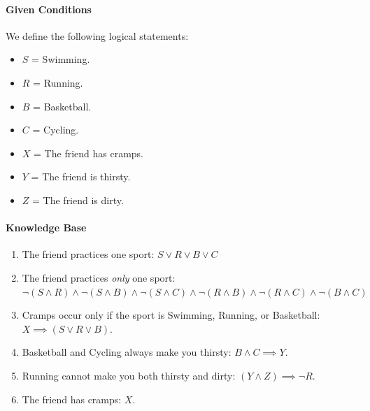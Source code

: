 \documentclass[11pt]{article}
\numberwithin{equation}{section}
\begin{document}
\begin{enumerate}
{\paragraph{Given Conditions}
We define the following logical statements:
\begin{itemize}
    \item $S$ = Swimming.
    \item $R$ = Running.
    \item $B$ = Basketball.
    \item $C$ = Cycling.
    \item $X$ = The friend has cramps.
    \item $Y$ = The friend is thirsty.
    \item $Z$ = The friend is dirty.
\end{itemize}

\paragraph{Knowledge Base}
\begin{enumerate}
    \item The friend practices one sport: $S \lor R \lor B \lor C$
    \item The friend practices \emph{only} one sport: $\neg (S \land R) \land \neg (S \land B) \land \neg (S \land C) \land \neg (R \land B) \land \neg (R \land C) \land \neg (B \land C)$
    \item Cramps occur only if the sport is Swimming, Running, or Basketball: $X \implies (S \lor R \lor B)$.
    \item Basketball and Cycling always make you thirsty: $B \land C \implies Y$.
    \item Running cannot make you both thirsty and dirty: $(Y \land Z) \implies \neg R$.
    \item The friend has cramps: $X$.
\end{enumerate}

}
\end{enumerate}
\end{document}
